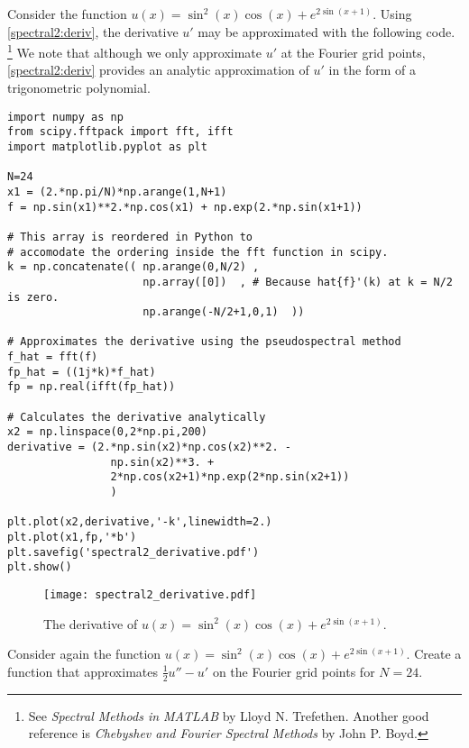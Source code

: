 Consider the function $u(x) = \sin^2 (x) \cos(x) +e^{2\sin(x+1)}$. 
Using \eqref{spectral2:deriv}, the derivative $u'$ may be approximated with the following code.  \footnote{See \textit{Spectral Methods in MATLAB} by Lloyd N. Trefethen.  Another good reference is \textit{Chebyshev and Fourier Spectral Methods} by John P. Boyd.}
We note that although we only approximate $u'$ at the Fourier grid points, \eqref{spectral2:deriv} provides an analytic approximation of $u'$ in the form of a trigonometric polynomial.

\begin{lstlisting}
import numpy as np
from scipy.fftpack import fft, ifft
import matplotlib.pyplot as plt

N=24
x1 = (2.*np.pi/N)*np.arange(1,N+1)
f = np.sin(x1)**2.*np.cos(x1) + np.exp(2.*np.sin(x1+1))

# This array is reordered in Python to
# accomodate the ordering inside the fft function in scipy.
k = np.concatenate(( np.arange(0,N/2) ,
					 np.array([0])	, # Because hat{f}'(k) at k = N/2 is zero.
					 np.arange(-N/2+1,0,1)	))

# Approximates the derivative using the pseudospectral method
f_hat = fft(f)
fp_hat = ((1j*k)*f_hat)
fp = np.real(ifft(fp_hat))

# Calculates the derivative analytically
x2 = np.linspace(0,2*np.pi,200)
derivative = (2.*np.sin(x2)*np.cos(x2)**2. - 
				np.sin(x2)**3. + 
				2*np.cos(x2+1)*np.exp(2*np.sin(x2+1))
				)

plt.plot(x2,derivative,'-k',linewidth=2.)
plt.plot(x1,fp,'*b')
plt.savefig('spectral2_derivative.pdf')
plt.show()

\end{lstlisting}




\begin{figure}
\centering
\texttt{[image: spectral2\_derivative.pdf]}
\caption{The derivative of $u(x) = \sin^2 (x) \cos(x) +e^{2\sin(x+1)}$.}
\label{fig:spectral:spectral2_derivative}
\end{figure}

\begin{problem}
Consider again the function $u(x) = \sin^2 (x) \cos(x) +e^{2\sin(x+1)}$.
Create a function that approximates $\frac{1}{2}u''-u'$ on the Fourier grid points for $N=24$.	
\end{problem}

% 
% 
% 


